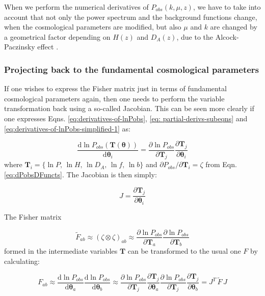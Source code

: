 When we perform the numerical derivatives
of $P_{obs}(k,\mu,z)$, we have to take into account that not only
the power spectrum and the background functions change, when the cosmological
parameters are modified, but also $\mu$ and $k$ are changed by a
geometrical factor depending on $H(z)$ and $D_{A}(z)$, due to the
Alcock-Paczinsky effect \citep{alcock1979anevolution}.


\subsubsection{Projecting back to the fundamental cosmological parameters}

If one wishes to express the Fisher matrix just in terms of fundamental
cosmological parameters again, then one needs to perform the variable
transformation back using a so-called Jacobian. This can be seen more
clearly if one expresses Eqns. \ref{eq:derivatives-of-lnPobs}, \ref{eq: partial-derivs-subeqns}
and \ref{eq:derivatives-of-lnPobs-simplified-1} as:

\begin{equation}
\frac{\mbox{d}\ln P_{obs}(\mathbf{T}(\boldsymbol{\theta}))}{\mbox{d}\boldsymbol{\theta}_{i}}=\frac{\partial\ln P_{obs}}{\partial\mathbf{T}{}_{j}}\frac{\partial\mathbf{T}_{j}}{\partial\boldsymbol{\theta}_{i}}
\end{equation}
where $\mathbf{T}_{i}=\{\ln P,\,\ln H,\,\ln D_{A},\,\ln f,\,\ln b\}$
and $\partial P_{obs}/\partial\mathbf{T}{}_{i}=\zeta$ from Eqn. \ref{eq:dPobsDFuncts}.
The Jacobian is then simply: 

\begin{equation}
J=\frac{\partial\mathbf{T}_{j}}{\partial\boldsymbol{\theta}_{i}}\label{eq:jacobian}
\end{equation}


The Fisher matrix 

\begin{equation}
\tilde{F}_{ab}\approx(\zeta\otimes\zeta)_{ab}\approx\frac{\partial\ln P_{obs}}{\partial\mathbf{T}{}_{a}}\frac{\partial\ln P_{obs}}{\partial\mathbf{T}{}_{b}}
\end{equation}
formed in the intermediate variables $\boldsymbol{T}$ can be transformed
to the usual one $F$ by calculating:

\begin{equation}
F_{ab}\approx\frac{\mbox{d}\ln P_{obs}}{\mbox{d}\boldsymbol{\theta}{}_{a}}\frac{\mbox{d}\ln P_{obs}}{\mbox{d}\boldsymbol{\theta}{}_{b}}\approx\frac{\partial\ln P_{obs}}{\partial\mathbf{T}{}_{j}}\frac{\partial\mathbf{T}_{j}}{\partial\boldsymbol{\theta}_{a}}\frac{\partial\ln P_{obs}}{\partial\mathbf{T}{}_{j}}\frac{\partial\mathbf{T}_{j}}{\partial\boldsymbol{\theta}_{b}}=J^{T}\,\tilde{F}\,J
\end{equation}


